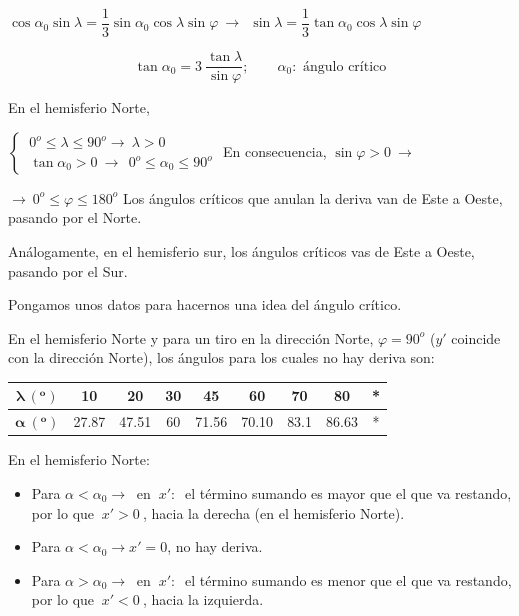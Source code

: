 $\cos \alpha_0 \sin \lambda = \dfrac 1 3 \sin \alpha_0 \cos \lambda \sin \varphi \ \to \ \ 
 \sin \lambda = \dfrac 1 3 \tan \alpha_0 \cos \lambda \sin \varphi$
 
 $$ \tan \alpha_0=3\ \dfrac {\tan \lambda}{\sin \varphi};\qquad \alpha_0: \text{ ángulo crítico}$$


En el hemisferio Norte, 

$\begin{cases}
\ 0^o\leq \lambda \leq 90^o \to \ \lambda>0 
\\ \ \tan \alpha_0>0 \ \to \ \ 0^o\leq \alpha_0 \leq 90^o
\end{cases}$
En consecuencia, $\sin \varphi>0 \ \to$

$\to \ 0^o\leq \varphi \leq 180^o$ Los ángulos críticos que anulan la deriva van de Este a Oeste, pasando por el Norte.

Análogamente, en el hemisferio sur, los ángulos críticos vas de Este a Oeste, pasando por el Sur.

Pongamos unos datos para hacernos una idea del ángulo crítico. 

En el hemisferio Norte y para un tiro en la dirección Norte, $\varphi = 90^o$ ($y'$ coincide con la dirección Norte), los ángulos para los cuales no hay deriva son:

\begin{table}[H]
\centering
\begin{tabular}{|c|c|c|c|c|c|c|c|c|}
\hline
\textbf{$\boldsymbol{\lambda\ (^o)}$} & 10    & 20    & 30 & 45    & 60    & 70   & 80    & * \\ \hline
\textbf{$\boldsymbol{\alpha\ (^o)}$}  & 27.87 & 47.51 & 60 & 71.56 & 70.10 & 83.1 & 86.63 & * \\ \hline
\end{tabular}
\end{table}

En el hemisferio Norte:
\begin{itemize}
\item Para $\alpha < \alpha_0 \to \ $ en $\ x':\  $ el término sumando es mayor que el que va restando, por lo que $\ x'>0 \ $, hacia la derecha (en el hemisferio Norte).
\item Para  $\alpha < \alpha_0 \to x'=0$, no hay deriva.
\item Para $\alpha > \alpha_0 \to \ $ en $\ x':\  $ el término sumando es menor que el que va restando, por lo que $\ x'<0 \ $, hacia la izquierda.
\end{itemize}

